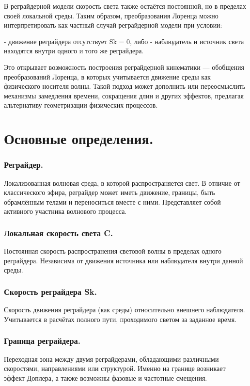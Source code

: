 \documentclass[12pt]{article}
\begin{document}
В реграйдерной модели скорость света также остаётся постоянной, но в пределах своей локальной среды. Таким образом, преобразования Лоренца можно интерпретировать как частный случай реграйдерной модели при условии:

- движение реграйдера отсутствует Sk = 0, либо
- наблюдатель и источник света находятся внутри одного и того же реграйдера.

Это открывает возможность построения реграйдерной кинематики — обобщения преобразований Лоренца, в которых учитывается движение среды как физического носителя волны. Такой подход может дополнить или переосмыслить механизмы замедления времени, сокращения длин и других эффектов, предлагая альтернативу геометризации физических процессов.

\section*{Основные определения.}

\subsubsection*{Реграйдер.}
Локализованная волновая среда, в которой распространяется свет. В отличие от классического эфира, реграйдер может иметь движение, границы, быть обрамлённым телами и переноситься вместе с ними. Представляет собой активного участника волнового процесса.

\subsubsection*{Локальная скорость света C.}
Постоянная скорость распространения световой волны в пределах одного реграйдера. Независима от движения источника или наблюдателя внутри данной среды.

\subsubsection*{Скорость реграйдера Sk.}
Скорость движения реграйдера (как среды) относительно внешнего наблюдателя. Учитывается в расчётах полного пути, проходимого светом за заданное время.

\subsubsection*{Граница реграйдера.}
Переходная зона между двумя реграйдерами, обладающими различными скоростями, направлениями или структурой. Именно на границе возникает эффект Доплера, а также возможны фазовые и частотные смещения.
\end{document}

